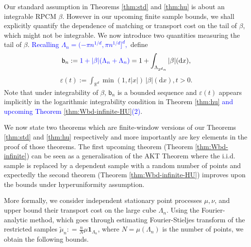 \documentclass[12pt]{article}
\newcommand{\bn}{   \mathsf b_{n}}
\newcommand{\1}{\mathbf{1}}
\newcommand{\md}{\mathrm{d}}
\newcommand{\dy}[1]{\textcolor{blue}{#1}}
\newcommand{\dy}[1]{#1}%
\begin{document}
{{{{ {Our standard assumption in Theorems \ref{thm:std} and \ref{thm:hu} is about an integrable RPCM $\beta$. However in our upcoming finite sample bounds, we shall explicitly quantify the dependence of matching or transport cost on the tail of $\beta$, which might not be integrable. We now introduce two quantities  measuring the tail of   $\beta$.} \dy{Recalling $ \Lambda _{n} = (-\pi n^{1/d} ,\pi n^{1/d}]^{d},$} define
\begin{align} \label{eq:bn} \bn: = \dy{1 + |\beta|(\Lambda_n + \Lambda_n)} = 1 +  \int_{\Lambda _{2^{d}n} } | \beta  | (\md x),
\end{align}
%
\begin{align}
\label{eq:def-eps}
\varepsilon (t):=  \int_{\mathbb{R}^{d}}\min(1,{  t| x | }) \, |\beta|(\md x),t>0.
\end{align}
%
{Note that under integrability of   $\beta$, $\bn$ is a bounded sequence and   $\varepsilon(t)$ appears implicitly in the logarithmic integrability condition in Theorem \ref{thm:hu} \dy{and upcoming Theorem \ref{thm:Wbd-infinite-HU}(2)}.}

 {We now state two theorems which are finite-window versions of our Theorems \ref{thm:std} and \ref{thm:hu} respectively and more importantly are key elements in the proof of those theorems. The first upcoming theorem (Theorem \ref{thm:Wbd-infinite}) can be seen as a generalisation of the AKT Theorem where the i.i.d. sample is replaced by a dependent sample with a random number of points and expectedly the second theorem (Theorem \ref{thm:Wbd-infinite-HU}) improves upon the bounds under hyperuniformity assumption.}

More formally, we consider independent stationary point processes $ \mu ,\nu $, and upper bound their transport cost on the large cube $\Lambda_n$. Using the Fourier-analytic method, which goes through estimating Fourier-Stieljes transform of the restricted samples $ \tilde \mu _{n}: = \frac{n}{N}\mu\1_{\Lambda _{n}}$, where $ N = \mu (\Lambda _{n})$ {is the number of points}, we obtain the following bounds.

}}}}
\end{document}
